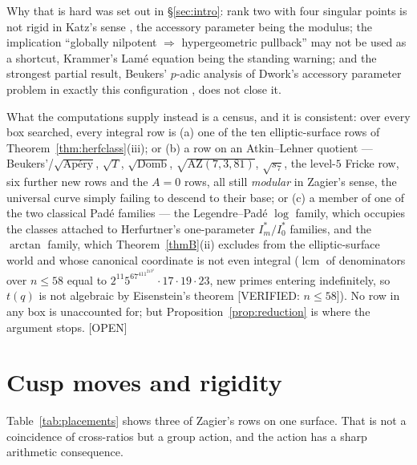 \documentclass[11pt,reqno]{amsart}
\theoremstyle{plain}
\theoremstyle{definition}
\theoremstyle{remark}
\theoremstyle{plain}
\newcommand{\VerifiedR}[1]{\textup{\textsf{[VERIFIED: #1]}}}
\newcommand{\Open}{\textup{\textsf{[OPEN]}}}
\begin{document}
Why that is hard was set out in \S\ref{sec:intro}: rank two with four singular
points is not rigid in Katz's sense \cite{Katz1996}, the accessory parameter
being the modulus; the implication ``globally nilpotent $\Rightarrow$
hypergeometric pullback'' may not be used as a shortcut, Krammer's Lam\'e
equation \cite{Krammer1996,MovasatiReiter} being the standing warning; and the
strongest partial result, Beukers' $p$-adic analysis of Dwork's accessory
parameter problem in exactly this configuration \cite{Beukers2002}, does not
close it.

What the computations supply instead is a census, and it is consistent: over
every box searched, every integral row is (a) one of the ten elliptic-surface
rows of Theorem~\ref{thm:herfclass}(iii); or (b) a row on an Atkin--Lehner
quotient --- Beukers'/$\sqrt{\text{Ap\'ery}}$, $\sqrt T$, $\sqrt{\text{Domb}}$,
$\sqrt{\mathrm{AZ}(7,3,81)}$, $\sqrt{s_7}$, the level-$5$ Fricke row, six further
new rows and the $A=0$ rows, all still \emph{modular} in Zagier's sense, the
universal curve simply failing to descend to their base; or (c) a member of one
of the two classical Pad\'e families --- the Legendre--Pad\'e $\log$ family, which
occupies the classes attached to Herfurtner's one-parameter $I_m^*/I_0^*$
families, and the $\arctan$ family, which Theorem~\ref{thmB}(ii) excludes from
the elliptic-surface world and whose canonical coordinate is not even integral
($\operatorname{lcm}$ of denominators over $n\le58$ equal to
$2^{11}5^67^411^213^2\cdot17\cdot19\cdot23$, new primes entering indefinitely, so
$t(q)$ is not algebraic by Eisenstein's theorem \VerifiedR{$n\le58$}). No row in
any box is unaccounted for; but Proposition~\ref{prop:reduction} is where the
argument stops. \Open{}

\section{Cusp moves and rigidity}\label{sec:cusp}

Table~\ref{tab:placements} shows three of Zagier's rows on one surface. That is not
a coincidence of cross-ratios but a group action, and the action has a sharp
arithmetic consequence.
\end{document}

